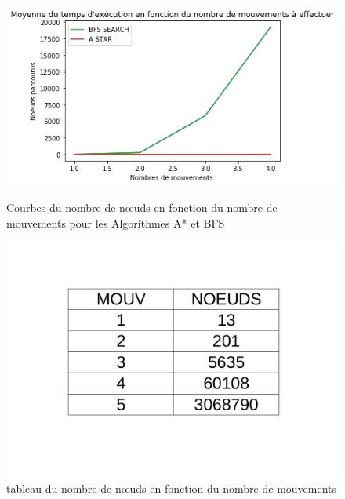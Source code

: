 \documentclass[a4paper]{article} %
\begin{document}
\begin{figure}[h]
	\begin{center}
	\includegraphics[scale=0.37]{./images/node.png}
	\caption{Courbes du nombre de nœuds en fonction du  nombre de mouvements pour les Algorithmes A* et BFS
	 }
	\end{center}
	\begin{center}
	\includegraphics[scale=0.14]{./images/tabBFS.png}
	\caption{tableau du nombre de nœuds en fonction du  nombre de mouvements}
	\end{center}
\end{figure}
\end{document}
